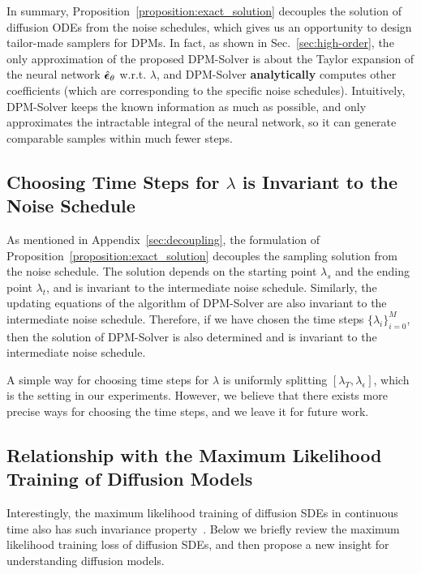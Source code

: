 In summary, Proposition~\ref{proposition:exact_solution} decouples the solution of diffusion ODEs from the noise schedules, which gives us an opportunity to design tailor-made samplers for DPMs. In fact, as shown in Sec.~\ref{sec:high-order}, the only approximation of the proposed DPM-Solver is about the Taylor expansion of the neural network $\hat{\bm{\epsilon}}_\theta$ w.r.t. $\lambda$, and DPM-Solver \textbf{analytically} computes other coefficients (which are corresponding to the specific noise schedules). Intuitively, DPM-Solver keeps the known information as much as possible, and only approximates the intractable integral of the neural network, so it can generate comparable samples within much fewer steps.

\subsection{Choosing Time Steps for $\lambda$ is Invariant to the Noise Schedule}
As mentioned in Appendix~\ref{sec:decoupling}, the formulation of Proposition~\ref{proposition:exact_solution} decouples the sampling solution from the noise schedule. The solution depends on the starting point $\lambda_s$ and the ending point $\lambda_t$, and is invariant to the intermediate noise schedule. Similarly, the updating equations of the algorithm of DPM-Solver are also invariant to the intermediate noise schedule. Therefore, if we have chosen the time steps $\{\lambda_i\}_{i=0}^M$, then the solution of DPM-Solver is also determined and is invariant to the intermediate noise schedule.

A simple way for choosing time steps for $\lambda$ is uniformly splitting $[\lambda_T, \lambda_{\epsilon}]$, which is the setting in our experiments. However, we believe that there exists more precise ways for choosing the time steps, and we leave it for future work.

\subsection{Relationship with the Maximum Likelihood Training of Diffusion Models}
Interestingly, the maximum likelihood training of diffusion SDEs in continuous time also has such invariance property~\citep{kingma2021variational}. Below we briefly review the maximum likelihood training loss of diffusion SDEs, and then propose a new insight for understanding diffusion models.


